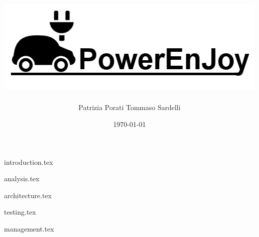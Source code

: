 \documentclass{beamer}
\author{Patrizia Porati \newline Tommaso Sardelli}
\title{\includegraphics{logo}}
\institute{Politecnico di Milano}
\date{\AdvanceDate[+1]\today}
\begin{document}
{introduction.tex}

{analysis.tex}

{architecture.tex}

{testing.tex}

{management.tex}
\end{document}
